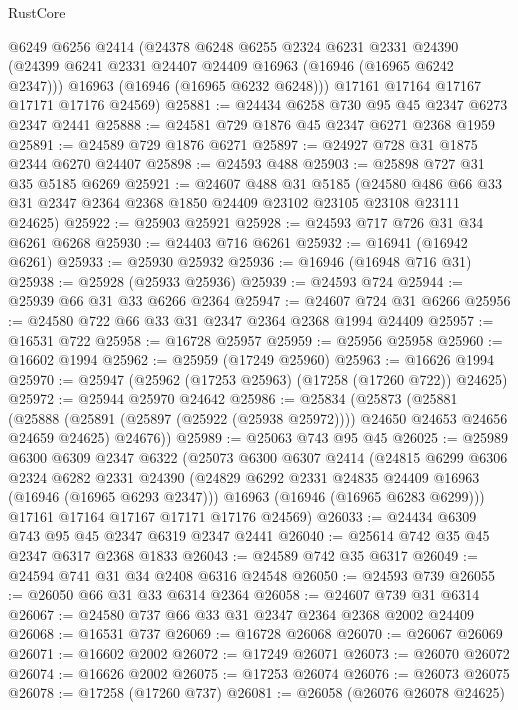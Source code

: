 \begin{lexlean}{RustCore}
\begin{coremodule}
      @6249
      @6256
      @2414
      (@24378
        @6248
        @6255
        @2324
        @6231
        @2331
        @24390
        (@24399 @6241 @2331 @24407 @24409 @16963 (@16946 (@16965 @6242 @2347)))
        @16963
        (@16946 (@16965 @6232 @6248)))
      @17161
      @17164
      @17167
      @17171
      @17176
      @24569)
@25881 := @24434 @6258 @730 @95 @45 @2347 @6273 @2347 @2441
@25888 := @24581 @729 @1876 @45 @2347 @6271 @2368 @1959
@25891 := @24589 @729 @1876 @6271
@25897 := @24927 @728 @31 @1875 @2344 @6270 @24407
@25898 := @24593 @488
@25903 := @25898 @727 @31 @35 @5185 @6269
@25921 := @24607
    @488
    @31
    @5185
    (@24580 @486 @66 @33 @31 @2347 @2364 @2368 @1850 @24409 @23102 @23105 @23108 @23111 @24625)
@25922 := @25903 @25921
@25928 := @24593 @717 @726 @31 @34 @6261 @6268
@25930 := @24403 @716 @6261
@25932 := @16941 (@16942 @6261)
@25933 := @25930 @25932
@25936 := @16946 (@16948 @716 @31)
@25938 := @25928 (@25933 @25936)
@25939 := @24593 @724
@25944 := @25939 @66 @31 @33 @6266 @2364
@25947 := @24607 @724 @31 @6266
@25956 := @24580 @722 @66 @33 @31 @2347 @2364 @2368 @1994 @24409
@25957 := @16531 @722
@25958 := @16728 @25957
@25959 := @25956 @25958
@25960 := @16602 @1994
@25962 := @25959 (@17249 @25960)
@25963 := @16626 @1994
@25970 := @25947 (@25962 (@17253 @25963) (@17258 (@17260 @722)) @24625)
@25972 := @25944 @25970 @24642
@25986 := @25834
    (@25873
      (@25881
        (@25888 (@25891 (@25897 (@25922 (@25938 @25972)))) @24650 @24653 @24656 @24659 @24625)
        @24676))
@25989 := @25063 @743 @95 @45
@26025 := @25989
    @6300
    @6309
    @2347
    @6322
    (@25073
      @6300
      @6307
      @2414
      (@24815
        @6299
        @6306
        @2324
        @6282
        @2331
        @24390
        (@24829 @6292 @2331 @24835 @24409 @16963 (@16946 (@16965 @6293 @2347)))
        @16963
        (@16946 (@16965 @6283 @6299)))
      @17161
      @17164
      @17167
      @17171
      @17176
      @24569)
@26033 := @24434 @6309 @743 @95 @45 @2347 @6319 @2347 @2441
@26040 := @25614 @742 @35 @45 @2347 @6317 @2368 @1833
@26043 := @24589 @742 @35 @6317
@26049 := @24594 @741 @31 @34 @2408 @6316 @24548
@26050 := @24593 @739
@26055 := @26050 @66 @31 @33 @6314 @2364
@26058 := @24607 @739 @31 @6314
@26067 := @24580 @737 @66 @33 @31 @2347 @2364 @2368 @2002 @24409
@26068 := @16531 @737
@26069 := @16728 @26068
@26070 := @26067 @26069
@26071 := @16602 @2002
@26072 := @17249 @26071
@26073 := @26070 @26072
@26074 := @16626 @2002
@26075 := @17253 @26074
@26076 := @26073 @26075
@26078 := @17258 (@17260 @737)
@26081 := @26058 (@26076 @26078 @24625)

\end{coremodule}
\end{lexlean}
